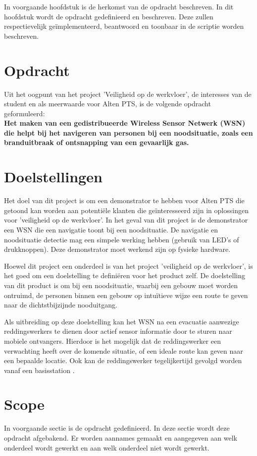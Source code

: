 \documentclass{../local}
\begin{document}
In voorgaande hoofdstuk is de herkomst van de  opdracht beschreven. In dit hoofdstuk wordt de opdracht gedefinieerd en beschreven.  Deze zullen respectievelijk geïmplementeerd, beantwoord en toonbaar in de scriptie worden beschreven. 

\section{Opdracht}
Uit het oogpunt van het project 'Veiligheid op de werkvloer', de interesses van de student en als meerwaarde voor Alten PTS, is de volgende opdracht geformuleerd: \\
\textbf{Het maken van een gedistribueerde Wireless Sensor Netwerk (WSN) die helpt bij het navigeren van personen bij een noodsituatie, zoals een branduitbraak of ontsnapping van een gevaarlijk gas.}

\section{Doelstellingen}
Het doel van dit project is om een demonstrator te hebben voor Alten PTS die getoond kan worden aan potentiële klanten die geïnteresseerd zijn in oplossingen voor 'veiligheid op de werkvloer'. In het geval van dit project is de demonstrator een WSN die een navigatie toont bij een noodsituatie. De navigatie en noodsituatie detectie mag een simpele werking hebben (gebruik van LED's of drukknoppen). Deze demonstrator moet werkend zijn op fysieke hardware. 

Hoewel dit project een onderdeel is van het project 'veiligheid op de werkvloer', is het goed om een doelstelling te definiëren voor het product zelf. De doelstelling van dit product is om bij een noodsituatie, waarbij een gebouw moet worden ontruimd, de personen binnen een gebouw op intuïtieve wijze een route te geven naar de dichtstbijzijnde nooduitgang.

Als uitbreiding op deze doelstelling kan het WSN na een evacuatie aanwezige reddingswerkers te dienen door actief sensor informatie door te sturen naar mobiele ontvangers. Hierdoor is het mogelijk dat de reddingswerker een verwachting heeft over de komende situatie, of een ideale route kan geven naar een bepaalde locatie. Ook kan de reddingswerker tegelijkertijd gevolgd worden vanaf een basisstation \cite{ShaWSN}.

\section{Scope}
In voorgaande sectie is de opdracht gedefinieerd. In deze sectie wordt deze opdracht afgebakend. Er worden aannames gemaakt en aangegeven aan welk onderdeel wordt gewerkt en aan welk onderdeel niet wordt gewerkt.
\end{document}
